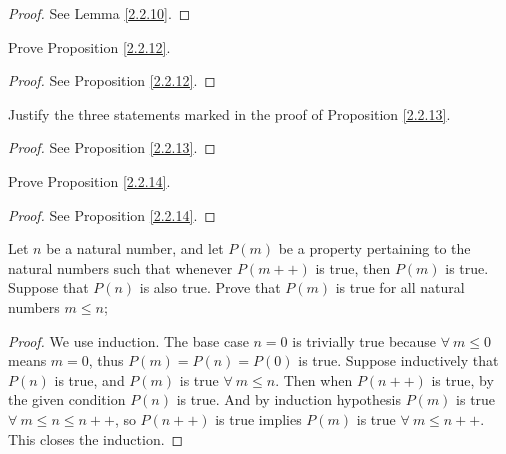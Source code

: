 \begin{proof}
    See Lemma \ref{2.2.10}.
\end{proof}

\begin{exercise}\label{ex 2.2.3}
    Prove Proposition \ref{2.2.12}.
\end{exercise}

\begin{proof}
    See Proposition \ref{2.2.12}.
\end{proof}

\begin{exercise}\label{ex 2.2.4}
    Justify the three statements marked in the proof of Proposition \ref{2.2.13}.
\end{exercise}

\begin{proof}
    See Proposition \ref{2.2.13}.
\end{proof}

\begin{exercise}\label{ex 2.2.5}
    Prove Proposition \ref{2.2.14}.
\end{exercise}

\begin{proof}
    See Proposition \ref{2.2.14}.
\end{proof}

\begin{exercise}\label{ex 2.2.6}
    Let \(n\) be a natural number, and let \(P(m)\) be a property pertaining to the natural numbers such that whenever \(P(m++)\) is true, then \(P(m)\) is true.
    Suppose that \(P(n)\) is also true.
    Prove that \(P(m)\) is true for all natural numbers \(m \leq n\);
\end{exercise}

\begin{proof}
    We use induction.
    The base case \(n = 0\) is trivially true because \(\forall\ m \leq 0\) means \(m = 0\), thus \(P(m) = P(n) = P(0)\) is true.
    Suppose inductively that \(P(n)\) is true, and \(P(m)\) is true \(\forall\ m \leq n\).
    Then when \(P(n++)\) is true, by the given condition \(P(n)\) is true.
    And by induction hypothesis \(P(m)\) is true \(\forall\ m \leq n \leq n++\), so \(P(n++)\) is true implies \(P(m)\) is true \(\forall\ m \leq n++\).
    This closes the induction.
\end{proof}